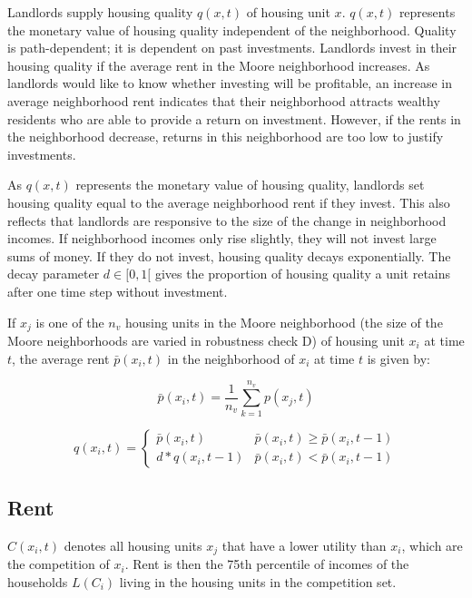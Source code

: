 \documentclass[a4paper,12pt]{article}
\begin{document}
Landlords supply housing quality $q(x, t)$ of housing unit $x$. $q(x, t)$ represents the monetary value of housing quality independent of the neighborhood. Quality is path-dependent; it is dependent on past investments. Landlords invest in their housing quality if the average rent in the Moore neighborhood increases. As landlords would like to know whether investing will be profitable, an increase in average neighborhood rent indicates that their neighborhood attracts wealthy residents who are able to provide a return on investment. However, if the rents in the neighborhood decrease, returns in this neighborhood are too low to justify investments.

As $q(x, t)$ represents the monetary value of housing quality, landlords set housing quality equal to the average neighborhood rent if they invest. This also reflects that landlords are responsive to the size of the change in neighborhood incomes. If neighborhood incomes only rise slightly, they will not invest large sums of money. If they do not invest, housing quality decays exponentially. The decay parameter $d \in [0, 1[$ gives the proportion of housing quality a unit retains after one time step without investment. 

If $x_j$ is one of the $n_v$ housing units in the Moore neighborhood (the size of the Moore neighborhoods are varied in robustness check D) of housing unit $x_i$ at time $t$, the average rent $\bar{p}(x_i, t)$ in the neighborhood of $x_i$ at time $t$ is given by:

\begin{equation}
\bar{p}(x_i, t) = \frac{1}{n_v} \sum_{k = 1}^{n_v} p(x_j, t)
\end{equation}

\begin{equation}
q(x_i, t) = 	\begin{cases}
			\bar{p}(x_i, t) & \bar{p}(x_i, t) \geq \bar{p}(x_i, t-1) \\
			d * q(x_i, t-1) & \bar{p}(x_i, t) < \bar{p}(x_i, t-1)
			\end{cases}
\end{equation}
\label{eq:quality}

\subsection*{Rent}

$C(x_i, t)$ denotes all housing units $x_j$ that have a lower utility than $x_i$, which are the competition of $x_i$. Rent is then the 75th percentile of incomes of the households $L(C_i)$ living in the housing units in the competition set.
\end{document}
